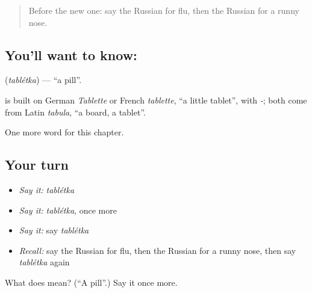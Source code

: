 \label{lesson:RU-C147-tabletka}



\begin{quote}
Before the new one: say the Russian for flu, then the Russian for a runny nose.
\end{quote}

\subsection*{You'll want to know: }
\textbf{} (\emph{tablétka}) — \textquotedblleft{}a pill\textquotedblright{}.

\begin{cousinweb}
\textbf{} is built on German \emph{Tablette} or French \emph{tablette}, \textquotedblleft{}a little tablet\textquotedblright{}, with \emph{-}; both come from Latin \emph{tabula}, \textquotedblleft{}a board, a tablet\textquotedblright{}.
\end{cousinweb}

\begin{grammarlens}[title={What you've built}]
One more word for this chapter.
\end{grammarlens}

\subsection*{Your turn}
\begin{itemize}
\raggedright
  \item \emph{Say it:} \emph{tablétka}
  \item \emph{Say it:} \emph{tablétka}, once more
  \item \emph{Say it:} say \emph{tablétka}
  \item \emph{Recall:} say the Russian for flu, then the Russian for a runny nose, then say \emph{tablétka} again
\end{itemize}

\begin{tcolorbox}[breakable,colback=teal!4,colframe=teal!35!black,title={Before you move on}]
What does  mean? (\textquotedblleft{}A pill\textquotedblright{}.) Say it once more.
\end{tcolorbox}
